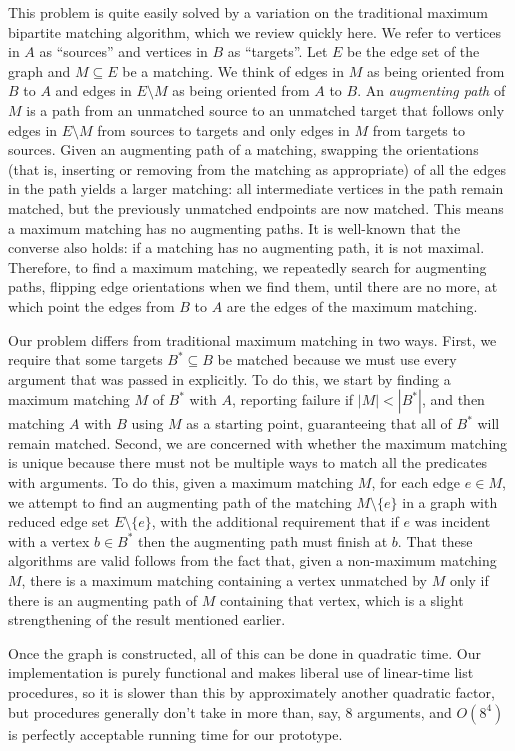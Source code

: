\documentclass[11pt]{article}
\begin{document}
This problem is quite easily solved by a variation on
the traditional maximum bipartite matching algorithm,
which we review quickly here.
We refer to vertices in $A$ as ``sources'' and vertices in $B$ as ``targets''.
Let $E$ be the edge set of the graph and $M \subseteq E$ be a matching.
We think of edges in $M$ as being oriented from $B$ to $A$
and edges in $E \setminus M$ as being oriented from $A$ to $B$.
An \emph{augmenting path} of $M$ is
a path from an unmatched source to an unmatched target
that follows only edges in $E \setminus M$ from sources to targets
and only edges in $M$ from targets to sources.
Given an augmenting path of a matching,
swapping the orientations
(that is, inserting or removing from the matching as appropriate)
of all the edges in the path
yields a larger matching:
all intermediate vertices in the path remain matched,
but the previously unmatched endpoints are now matched.
This means a maximum matching has no augmenting paths.
It is well-known that the converse also holds:
if a matching has no augmenting path, it is not maximal.
Therefore, to find a maximum matching,
we repeatedly search for augmenting paths,
flipping edge orientations when we find them,
until there are no more,
at which point the edges from $B$ to $A$ are the edges of the maximum matching.

Our problem differs from traditional maximum matching in two ways.
First, we require that some targets $B^* \subseteq B$ be matched
because we must use every argument that was passed in explicitly.
To do this, we start by finding a maximum matching $M$ of $B^*$ with $A$,
reporting failure if $|M| < |B^*|$,
and then matching $A$ with $B$ using $M$ as a starting point,
guaranteeing that all of $B^*$ will remain matched.
Second, we are concerned with whether the maximum matching is unique
because there must not be multiple ways
to match all the predicates with arguments.
To do this, given a maximum matching $M$,
for each edge $e \in M$,
we attempt to find an augmenting path of the matching $M \setminus \{e\}$
in a graph with reduced edge set $E \setminus \{e\}$,
with the additional requirement that
if $e$ was incident with a vertex $b \in B^*$
then the augmenting path must finish at $b$.
That these algorithms are valid follows from the fact that,
given a non-maximum matching $M$,
there is a maximum matching containing a vertex unmatched by $M$
only if there is an augmenting path of $M$ containing that vertex,
which is a slight strengthening of the result mentioned earlier.

Once the graph is constructed, all of this can be done in quadratic time.
Our implementation is purely functional
and makes liberal use of linear-time list procedures,
so it is slower than this by approximately another quadratic factor,
but procedures generally don't take in more than, say, 8 arguments,
and $O(8^4)$ is perfectly acceptable running time for our prototype.
\end{document}
